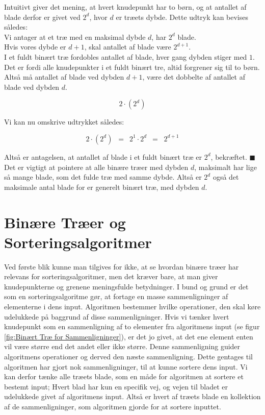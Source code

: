 Intuitivt giver det mening, at hvert knudepunkt har to børn, og at antallet af blade derfor er givet ved $2^d$, hvor $d$ er træets dybde. Dette udtryk kan bevises således:\\

Vi antager at et træ med en maksimal dybde $d$, har $2^d$ blade.\\

Hvis vores dybde er $d + 1$, skal antallet af blade være $2^{d+1}$.\\

I et fuldt binært træ fordobles antallet af blade, hver gang dybden stiger med $1$. Det er fordi alle knudepunkter i et fuldt binært tre, altid forgrener sig til to børn. Altså må antallet af blade ved dybden $d+1$, være det dobbelte af antallet af blade ved dybden $d$.

$$2\cdot (2^d)$$

Vi kan nu omskrive udtrykket således:

$$2\cdot (2^d) \,\,\,=\,\,\, 2^1 \cdot 2^d \,\,\,=\,\,\ 2^{d+1}$$

Altså er antagelsen, at antallet af blade i et fuldt binært træ er $2^d$, bekræftet. $\blacksquare$\\

Det er vigtigt at pointere at alle binære træer med dybden $d$, maksimalt har lige så mange blade, som det fulde træ med samme dybde. Altså er $2^d$ også det maksimale antal blade for er generelt binært træ, med dybden $d$.



\section{Binære Træer og Sorteringsalgoritmer}
\label{sec:Binære Træer og Sorteringsalgoritmer}

Ved første blik kunne man tilgives for ikke, at se hvordan binære træer har relevans for sorteringsalgoritmer, men det kræver bare, at man giver knudepunkterne og grenene meningsfulde betydninger. I bund og grund er det som en sorteringsalgoritme gør, at fortage en masse sammenligninger af elementerne i dens input. Algoritmen bestemmer hvilke operationer, den skal køre udelukkede på baggrund af disse sammenligninger. Hvis vi tænker hvert knudepunkt som en sammenligning af to elementer fra algoritmens input (se figur \ref{fig:Binært Træ for Sammenligninger}), er det jo givet, at det ene element enten vil være større end det andet eller ikke større. Denne sammenligning guider algoritmens operationer og derved den næste sammenligning. Dette gentages til algoritmen har gjort nok sammenligninger, til at kunne sortere dens input. Vi kan derfor tænke alle træets blade, som en måde for algoritmen at sortere et bestemt input; Hvert blad har kun en specifik vej, og vejen til bladet er udelukkede givet af algoritmens input. Altså er hvert af træets blade en kollektion af de sammenligninger, som algoritmen gjorde for at sortere inputtet. \cite[s. 109]{aogd}

